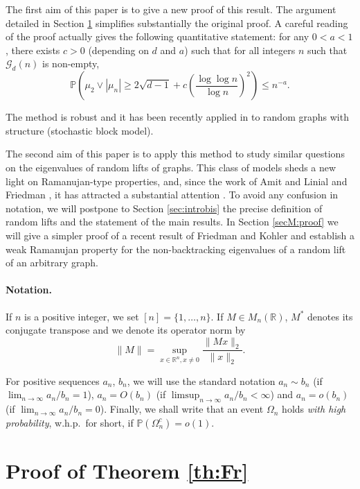 \documentclass[11pt]{article}
\newcommand{\dP}{\mathbb{P}}
\newcommand{\dR}{\mathbb {R}}
\newcommand{\cG}{\mathcal {G}}
\newcommand{\PAR}[1]{{{\left(#1\right)}}} %
\newcommand{\1}{1\!\!{\sf I}}\newcommand{\IND}{\1}
\newcommand{\whp}{{w.h.p.~}}
\begin{document}
The first aim of this paper is to give a new proof of this result. The argument detailed in Section \ref{sec:proofF} simplifies substantially the original proof. A careful reading of the proof actually gives the following quantitative statement: for any $0 < a < 1$, there exists $c>0$ (depending on $d$ and $a$) such that for all integers $n$ such that $\cG_d(n)$ is non-empty,
\begin{equation}\label{eq:QFried}
\dP \PAR{  \mu_2 \vee |\mu_n| \geq 2 \sqrt{d-1} +c \PAR{\frac{\log \log n }{ \log n}} ^2 } \leq  n^{-a}.  
\end{equation}

The method is robust and it has been recently applied in \cite{BLM} to random graphs with structure (stochastic block model). 


The second aim of this paper is to apply this method to study similar questions on the eigenvalues of random lifts of graphs. This class of models  sheds a new light on Ramanujan-type  properties, and, since the work of Amit and Linial \cite{MR1883559,MR2216470} and Friedman \cite{MR1978881},  it has attracted a substantial attention \cite{MR2674623,AB-S,MR2799807,puder,FrKo}. To avoid any confusion in notation, we will postpone to Section \ref{sec:introbis} the precise definition of random lifts and the statement of the main results. In Section \ref{secM:proof} we will give a simpler proof of a recent result of Friedman and Kohler \cite{FrKo} and establish a weak Ramanujan property for the non-backtracking eigenvalues of a random lift of an arbitrary graph. 

 \paragraph{Notation.}
If $n$ is a positive integer, we set $[n ] = \{ 1, \ldots, n\}$. If $M \in M_n(\dR)$, $M^*$ denotes its conjugate transpose and we denote its operator norm by 
$$
\| M \| = \sup_{x \in \dR^n, x \ne 0} \frac{\| M x\|_ 2}{\|x \|_2}. 
$$

For positive sequences $a_n$, $b_n$, we will use the standard notation $a_n \sim b_n$ (if $\lim_{ n \to \infty} a_n / b_n =  1$),  $a_n = O(b_n)$ (if $\limsup_{n \to \infty} a_n / b_n < \infty$) and $a_n = o(b_n)$ (if $\lim_{n \to \infty} a_n / b_n  = 0$).  Finally, we shall write that an event $\Omega_n$ holds {\em with high probability}, \whp for short, if  $\dP ( \Omega_n^c)  =o(1)$. 




\section{Proof of  Theorem \ref{th:Fr}}
\label{sec:proofF}
\end{document}
